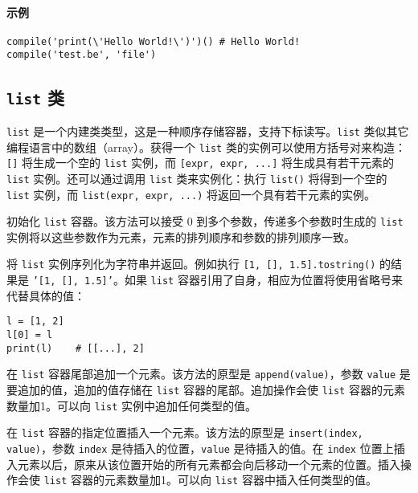 \paragraph{示例}
\begin{lstlisting}[language=berry, numbers=none]
compile('print(\'Hello World!\')')() # Hello World!
compile('test.be', 'file')
\end{lstlisting}


\subsection{\texttt{list} 类}

\texttt{list} 是一个内建类类型，这是一种顺序存储容器，支持下标读写。\texttt{list} 类似其它编程语言中的数组（array）。获得一个 \texttt{list} 类的实例可以使用方括号对来构造：\texttt{[]} 将生成一个空的 \texttt{list} 实例，而 \texttt{[expr, expr, ...]} 将生成具有若干元素的 \texttt{list} 实例。还可以通过调用 \texttt{list} 类来实例化：执行 \texttt{list()} 将得到一个空的 \texttt{list} 实例，而 \texttt{list(expr, expr, ...)} 将返回一个具有若干元素的实例。


初始化 \texttt{list} 容器。该方法可以接受 0 到多个参数，传递多个参数时生成的 \texttt{list} 实例将以这些参数作为元素，元素的排列顺序和参数的排列顺序一致。


将 \texttt{list} 实例序列化为字符串并返回。例如执行 \texttt{[1, [], 1.5].tostring()} 的结果是 \texttt{'[1, [], 1.5]'}。如果 \texttt{list} 容器引用了自身，相应为位置将使用省略号来代替具体的值：
\begin{lstlisting}[language=berry, numbers=none]
l = [1, 2]
l[0] = l
print(l)    # [[...], 2]
\end{lstlisting}


在 \texttt{list} 容器尾部追加一个元素。该方法的原型是 \texttt{append(value)}，参数 \texttt{value} 是要追加的值，追加的值存储在 \texttt{list} 容器的尾部。追加操作会使 \texttt{list} 容器的元素数量加1。可以向 \texttt{list} 实例中追加任何类型的值。


在 \texttt{list} 容器的指定位置插入一个元素。该方法的原型是 \texttt{insert(index, value)}，参数 \texttt{index} 是待插入的位置，\texttt{value} 是待插入的值。在 \texttt{index} 位置上插入元素以后，原来从该位置开始的所有元素都会向后移动一个元素的位置。插入操作会使 \texttt{list} 容器的元素数量加1。可以向 \texttt{list} 容器中插入任何类型的值。

